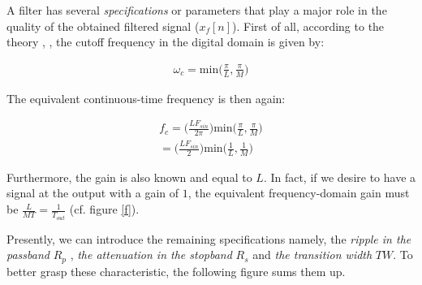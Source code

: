  A filter has several \textit{specifications} or parameters that play a major role in the quality of the obtained filtered signal ($x_f[n]$). First of all, according to the theory \cite{Proakis}, \cite{Oppenheim}, the cutoff frequency in the digital domain is given by: 
	
\begin{align}
	\omega_c = \text{min}\Big(\frac{\pi}{L},\frac{\pi}{M}\Big) \label{eqn:cutoff_digital}
\end{align}

The equivalent continuous-time frequency is then again:

\begin{align}
f_c = \Big(\frac{LF_{sin}}{2\pi} \Big)\text{min}\Big(\frac{\pi}{L},\frac{\pi}{M}\Big) \nonumber \\ 
= \Big(\frac{LF_{sin}}{2} \Big)\text{min}\Big(\frac{1}{L},\frac{1}{M} \Big) \label{eqn:cutoff_continuous}
\end{align}

Furthermore, the gain is also known and equal to $L$. In fact, if we desire to have a signal at the output with a gain of $1$, the equivalent frequency-domain gain must be $\frac{L}{MT} = \frac{1}{T_{out}}$ (cf. figure \ref{f}). 

Presently, we can introduce the remaining specifications namely, the \textit{ripple in the passband} $R_p$ , \textit{the attenuation in the stopband} $R_s$ and \textit{the transition width} $TW$. To better grasp these characteristic, the following figure sums them up. 


